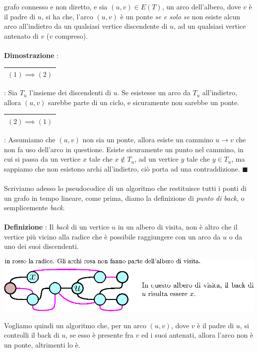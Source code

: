 \documentclass[12pt, letterpaper]{article}
\newcommand{\acc}{\\\hphantom{}\\}
\newcommand{\boxedMath}[1]{\begin{tabular}{|c|}\hline \texttt{#1} \\ \hline\end{tabular} :}
\begin{document}
grafo connesso e non diretto, e sia $(u,v)\in E(T)$, un arco dell'albero, dove $v$ è il padre di $u$, si ha che,
l'arco  $(u,v)$ è un ponte \textit{se e solo se} non esiste alcun arco all'indietro da un qualsiasi vertice
discendente di $u$, ad un qualsiasi vertice antenato di $v$ ($v$ compreso).\acc
\textbf{Dimostrazione} : \boxedMath{$(1)\implies(2)$} Sia $T_u$ l'insieme dei discendenti di $u$. Se esistesse un arco da  $T_u$ all'indietro,
allora $(u,v)$ sarebbe parte di un ciclo, e sicuramente non sarebbe un ponte. \boxedMath{$(2)\implies(1)$} Assumiamo che
$(u,v)$ non sia un ponte, allora esiste un cammino $u\rightarrow v$ che non fa uso dell'arco in questione. Esiste sicuramente
un punto nel cammino, in cui si passa da un vertice $x$ tale che $x\notin T_u$, ad un vertice $y$ tale che
$y\in T_u$, ma sappiamo che non esistono archi all'indietro, ciò porta ad una contraddizione. $\blacksquare$\acc
Scriviamo adesso lo pseudocodice di un algoritmo che restituisce tutti i ponti di un grafo in tempo lineare, come prima, diamo
la definizione di \textit{punto di back}, o semplicemente \textit{back}.\acc
\textbf{Definizione} : Il \textit{back} di un vertice $u$ in un albero di visita, non è altro che il vertice più
vicino alla radice che è possibile raggiungere con un arco da $u$ o da uno dei suoi discendenti.\begin{center}
    \includegraphics[width=1\textwidth ]{images/back.eps}
\end{center}
Vogliamo quindi un algoritmo che, per un arco $(u,v)$, dove $v$ è il padre di $u$, si controlli il
back di $u$, se esso è presente fra $v$ ed i suoi antenati, allora l'arco non è un ponte, altrimenti lo è.
\end{document}
